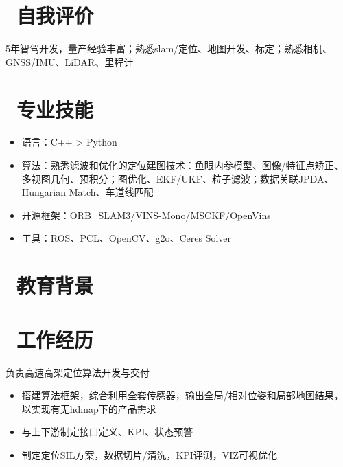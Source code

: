 \documentclass{resume}
\begin{document}




\section{\faBook\ 自我评价}
5年智驾开发，量产经验丰富；熟悉slam/定位、地图开发、标定；熟悉相机、GNSS/IMU、LiDAR、里程计

\section{\faCogs\ 专业技能}
\begin{itemize}[parsep=0.5ex]
  \item 语言：C++ > Python
  \item 算法：熟悉滤波和优化的定位建图技术：鱼眼内参模型、图像/特征点矫正、多视图几何、预积分；图优化、EKF/UKF、粒子滤波；数据关联JPDA、Hungarian Match、车道线匹配
  \item 开源框架：ORB\_SLAM3/VINS-Mono/MSCKF/OpenVins
  \item 工具：ROS、PCL、OpenCV、g2o、Ceres Solver
\end{itemize}

\section{\faGraduationCap\  教育背景}

\section{\faUsers\ 工作经历}
\begin{onehalfspacing}
  负责高速高架定位算法开发与交付
  \begin{itemize}
    \item {搭建算法框架，综合利用全套传感器，输出全局/相对位姿和局部地图结果，以实现有无hdmap下的产品需求}
    \item 与上下游制定接口定义、KPI、状态预警
    \item 制定定位SIL方案，数据切片/清洗，KPI评测，VIZ可视优化
  \end{itemize}
\end{onehalfspacing}
\end{document}
